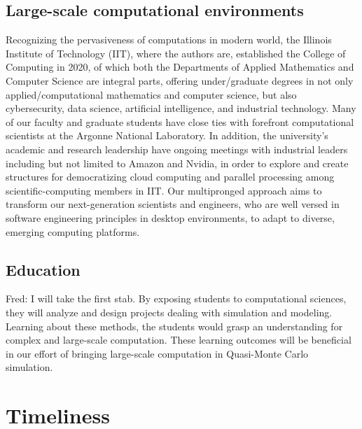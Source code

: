 \documentclass{amsart}
\newcommand{\FJHNote}[1]{{\color{blue}Fred: #1}}
\begin{document}
\subsection{Large-scale computational environments}  Recognizing the pervasiveness of computations in modern world,  the Illinois Institute of Technology (IIT), where the authors are,  established the College of Computing in 2020, of which both the Departments of Applied Mathematics and Computer Science are integral parts, offering under/graduate degrees in not only applied/computational mathematics and computer science, but also cybersecurity, data science, artificial intelligence, and industrial technology. Many of our faculty and graduate students have close ties with forefront computational scientists at the Argonne National Laboratory. In addition, the university's academic and research leadership have ongoing meetings with industrial leaders including but not limited to Amazon and  Nvidia, in order to explore and create structures for democratizing cloud computing and parallel processing among scientific-computing members in IIT. Our multipronged approach aims to transform our next-generation scientists and engineers, who are well versed in software engineering principles in desktop environments, to adapt to diverse, emerging computing platforms.

\subsection{Education} \FJHNote{I will take the first stab.} %
By exposing students to computational sciences, they will analyze and design projects dealing with simulation and modeling. Learning about these methods, the students would grasp an understanding for complex and large-scale computation. These learning outcomes will be beneficial in our effort of bringing large-scale computation in Quasi-Monte Carlo simulation.


\section{Timeliness} %
\end{document}
